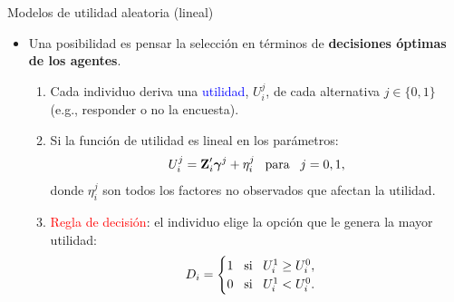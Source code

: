 \documentclass[10pt, xcolor=dvipsnames]{beamer}
\begin{document}
\begin{frame}{Modelos de utilidad aleatoria (lineal)}
\begin{itemize}\setlength{\itemsep}{1em}
	\item Una posibilidad es pensar la selección en términos de \textbf{decisiones óptimas de los agentes}. 
    \vspace{0.5em}
	\begin{enumerate}\setlength{\itemsep}{0.4em}
		\item Cada individuo deriva una \textcolor{blue}{utilidad}, $U^j_{i}$, de cada alternativa $j\in\{0,1\}$ (e.g., responder o no la encuesta).
		\smallspace
		\item Si la función de utilidad es lineal en los parámetros:
		\begin{align*}
			U^j_i = \textbf{Z}'_i\boldsymbol{\gamma}^j + \eta^j_i \;\;\; \text{para} \;\;\; j=0,1,
		\end{align*}
		donde $\eta^j_i$ son todos los factores no observados que afectan la utilidad.
		\item \textcolor{red}{Regla de decisión}: el individuo elige la opción que le genera la mayor utilidad:   
		\begin{align*}
			D_i =\begin{cases}
				1 \hspace{0.3cm} \text{si} \;\;\; U^1_i \geq U^0_i, \\			
				0 \hspace{0.3cm} \text{si} \;\;\; U^1_i < U^0_i.\\
			\end{cases}
		\end{align*}
	\end{enumerate}
\end{itemize}
\end{frame}
\end{document}
